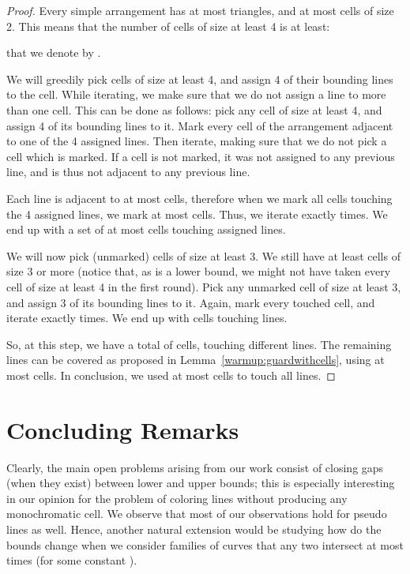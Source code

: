 \documentclass[11pt,a4paper]{article}
\newcommand{\sholong}[2]{#2}
\begin{document}
\begin{proof}
Every simple arrangement has at most  triangles, and at most  cells of size 2. This means that the number of cells of size at least 4 is at least:



\noindent that we denote by .

We will greedily pick cells of size at least 4, and assign 4 of their bounding lines to the cell. While iterating, we make sure that we do not assign a line to more than one cell. This can be done as follows: pick any cell  of size at least 4, and assign 4 of its bounding lines to it. Mark every cell of the arrangement adjacent to one of the 4 assigned lines. Then iterate, making sure that we do not pick a cell which is marked. If a cell is not marked, it was not assigned to any previous line, and is thus not adjacent to any previous line.

Each line is adjacent to at most  cells, therefore when we mark all cells touching the 4 assigned lines, we mark at most  cells.
Thus, we iterate exactly  times. We end up with a set of at most  cells touching  assigned lines.

We will now pick (unmarked) cells of size at least 3. We still have at least  cells of size 3 or more (notice that, as  is a lower bound, we might not have taken every cell of size at least 4 in the first round). Pick any unmarked cell  of size at least 3, and assign 3 of its bounding lines to it. Again, mark every touched cell, and iterate exactly  times. We end up with  cells touching  lines.

So, at this step, we have a total of  cells, touching  different lines. The remaining  lines can be covered as proposed in Lemma~\ref{warmup:guardwithcells}, using at most   cells. In conclusion, we used at most  cells to touch all lines.
\end{proof}
\fi


\section{Concluding Remarks}\label{sec:conclusion}
Clearly, the main open problems arising from our work consist of closing gaps (when they exist) between lower and upper bounds; this is especially interesting in our opinion for the
problem of coloring lines without producing any monochromatic cell. \sholong{}{We observe that most of our observations hold for pseudo lines as well. Hence, another natural extension would be studying how do the bounds change when we consider families of curves that any two intersect at most  times (for some constant ).}
\end{document}
